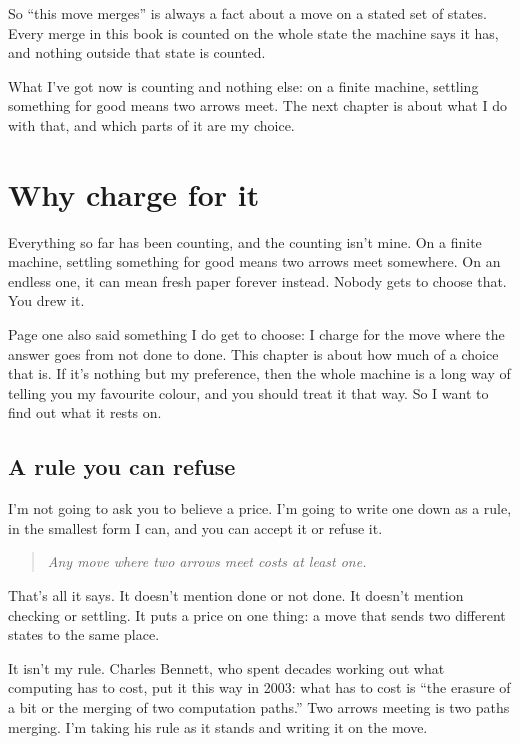\documentclass[11pt,twoside]{article}
\theoremstyle{thielethm}
\theoremstyle{thieledef}
\theoremstyle{thieledef}
\theoremstyle{thieledef}
\theoremstyle{thielethm}
\theoremstyle{thieleobs}
\theoremstyle{thielethm}
\begin{document}
So ``this move merges'' is always a fact about a move on a stated set of states. Every merge in this book is counted on the whole state the machine says it has, and nothing outside that state is counted.

What I've got now is counting and nothing else: on a finite machine, settling something for good means two arrows meet. The next chapter is about what I do with that, and which parts of it are my choice.

\section{Why charge for it}
\label{sec:why-charge}

Everything so far has been counting, and the counting isn't mine. On a finite machine, settling something for good means two arrows meet somewhere. On an endless one, it can mean fresh paper forever instead. Nobody gets to choose that. You drew it.

Page one also said something I do get to choose: I charge for the move where the answer goes from not done to done. This chapter is about how much of a choice that is. If it's nothing but my preference, then the whole machine is a long way of telling you my favourite colour, and you should treat it that way. So I want to find out what it rests on.

\subsection{A rule you can refuse}

I'm not going to ask you to believe a price. I'm going to write one down as a rule, in the smallest form I can, and you can accept it or refuse it.

\begin{quote}
\textit{Any move where two arrows meet costs at least one.}
\end{quote}

That's all it says. It doesn't mention done or not done. It doesn't mention checking or settling. It puts a price on one thing: a move that sends two different states to the same place.

It isn't my rule. Charles Bennett, who spent decades working out what computing has to cost, put it this way in 2003: what has to cost is ``the erasure of a bit or the merging of two computation paths.'' Two arrows meeting is two paths merging. I'm taking his rule as it stands and writing it on the move.
\end{document}
